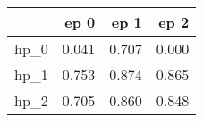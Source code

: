 \begin{tabular}{lrrr}
\toprule
{} &   ep 0 &   ep 1 &   ep 2 \\
\midrule
hp\_0 &  0.041 &  0.707 &  0.000 \\
hp\_1 &  0.753 &  0.874 &  0.865 \\
hp\_2 &  0.705 &  0.860 &  0.848 \\
\bottomrule
\end{tabular}

